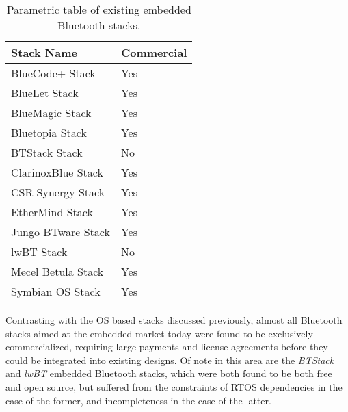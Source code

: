 \begin{table}[H]
	\begin{center}
		\begin{tabular}{ | l | l |}
			\hline
			\textbf{Stack Name}	& \textbf{Commercial} \\ \hline

			BlueCode+ Stack		& Yes	\\ \hline
			BlueLet Stack		& Yes	\\ \hline
			BlueMagic Stack		& Yes	\\ \hline
			Bluetopia Stack		& Yes	\\ \hline
			BTStack Stack		& No	\\ \hline
			ClarinoxBlue Stack	& Yes	\\ \hline
			CSR Synergy Stack	& Yes	\\ \hline
			EtherMind Stack		& Yes	\\ \hline
			Jungo BTware Stack	& Yes	\\ \hline
			lwBT Stack			& No	\\ \hline
			Mecel Betula Stack	& Yes	\\ \hline
			Symbian OS Stack	& Yes	\\ \hline
		\end{tabular}
		\caption[Existing embedded Bluetooth stacks]{Parametric table of existing embedded Bluetooth stacks.}
		\label{tab:embbtstacks}
	\end{center}
\end{table}

Contrasting with the OS based stacks discussed previously, almost all Bluetooth stacks aimed at the embedded market today were found to be exclusively commercialized, requiring large payments and license agreements before they could be integrated into existing designs. Of note in this area are the \textit{BTStack} and \textit{lwBT} embedded Bluetooth stacks, which were both found to be both free and open source, but suffered from the constraints of RTOS dependencies in the case of the former, and incompleteness in the case of the latter.
